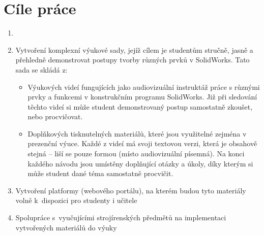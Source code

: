 \chapter{Cíle práce}

\begin{enumerate}[topsep=0pt]
    \setlength\itemsep{0em}
    \item {}
    \item Vytvoření komplexní výukové sady, jejíž cílem je studentům stručně, jasně a přehledně demonstrovat postupy tvorby různých prvků v SolidWorks. Tato sada se skládá z:
    \begin{itemize}[topsep=0pt]
        \setlength\itemsep{0em}
        \item Výukových videí fungujících jako audiovizuální instruktáž práce s různými prvky a funkcemi v konstrukčním programu SolidWorks. Již při sledování těchto videí si může student demonstrovaný postup samostatně zkoušet, nebo procvičovat. 
        \item Doplňkových tisknutelných materiálů, které jsou využitelné zejména v prezenční výuce. Každé z videí má svoji textovou verzi, která je obsahově stejná -- liší se pouze formou (místo audiovizuální písemná). Na konci každého návodu jsou umístěny doplňující otázky a úkoly, díky kterým si může student dané téma samostatně procvičit.
    \end{itemize}
    \item Vytvoření platformy (webového portálu), na kterém budou tyto materiály volně k~dispozici pro studenty i učitele
    \item Spolupráce s~vyučujícími strojírenských předmětů na implementaci vytvořených materiálů do výuky
\end{enumerate}
